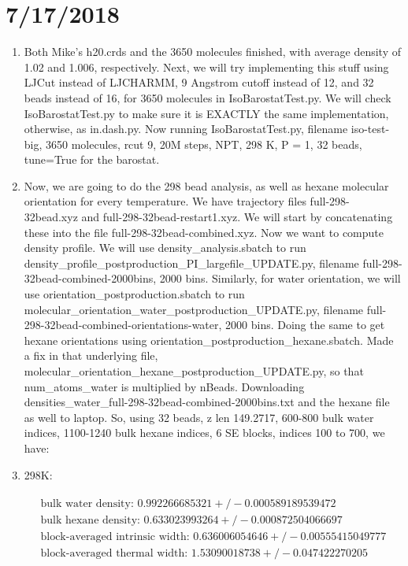 \documentclass[12pt,reqno]{amsart}
\numberwithin{equation}{section}
\begin{document}
\section{7/17/2018}
\begin{enumerate}
\item Both Mike's h20.crds and the 3650 molecules finished, with average density of 1.02 and 1.006, respectively.  Next, we will try implementing this stuff using LJCut instead of LJCHARMM, 9 Angstrom cutoff instead of 12, and 32 beads instead of 16, for 3650 molecules in IsoBarostatTest.py.  We will check IsoBarostatTest.py to make sure it is EXACTLY the same implementation, otherwise, as in.dash.py.  Now running IsoBarostatTest.py, filename iso-test-big, 3650 molecules, rcut 9, 20M steps, NPT, 298 K, P = 1, 32 beads, tune=True for the barostat.  
\item Now, we are going to do the 298 bead analysis, as well as hexane molecular orientation for every temperature.  We have trajectory files full-298-32bead.xyz and full-298-32bead-restart1.xyz.  We will start by concatenating these into the file full-298-32bead-combined.xyz.  Now we want to compute density profile.  We will use density\_analysis.sbatch to run density\_profile\_postproduction\_PI\_largefile\_UPDATE.py, filename full-298-32bead-combined-2000bins, 2000 bins.  Similarly, for water orientation, we will use orientation\_postproduction.sbatch to run molecular\_orientation\_water\_postproduction\_UPDATE.py, filename full-298-32bead-combined-orientations-water, 2000 bins.  Doing the same to get hexane orientations using orientation\_postproduction\_hexane.sbatch.  Made a fix in that underlying file, molecular\_orientation\_hexane\_postproduction\_UPDATE.py, so that num\_atoms\_water is multiplied by nBeads.  Downloading densities\_water\_full-298-32bead-combined-2000bins.txt and the hexane file as well to laptop.  So, using 32 beads, z len 149.2717, 600-800 bulk water indices, 1100-1240 bulk hexane indices, 6 SE blocks, indices 100 to 700, we have:

\item 298K: 

\begin{align}
\begin{split}
\text{bulk water density: } 0.992266685321  +/- 0.000589189539472 \\
\text{bulk hexane density: } 0.633023993264  +/- 0.000872504066697\\
\text{block-averaged intrinsic width: } 0.636006054646  +/- 0.00555415049777\\
\text{block-averaged thermal width: } 1.53090018738  +/- 0.047422270205 \\
\end{split}
\end{align} 


\end{enumerate}
\end{document}
